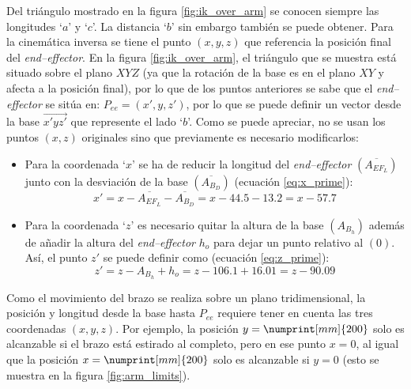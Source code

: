 Del triángulo mostrado en la figura \ref{fig:ik_over_arm} se conocen siempre las longitudes
`$a$' y `$c$'. La distancia `$b$' sin embargo también se puede obtener. Para la cinemática
inversa se tiene el punto $\left(x, y, z\right)$ que referencia la posición final del
\textit{end--effector}. En la figura \ref{fig:ik_over_arm}, el triángulo que se muestra
está situado sobre el plano $XYZ$ (ya que la rotación de la base es en el plano $XY$
y afecta a la posición final), por lo que de los puntos anteriores
se sabe que el \textit{end--effector} se sitúa en: $P_{ee} = \left(x', y, z'\right)$, 
por lo que se puede definir un vector desde la base $\overrightarrow{x'yz'}$ que 
represente el lado `$b$'. Como se puede apreciar, no se usan los puntos $\left(x, z\right)$ 
originales sino que previamente es necesario modificarlos:
\begin{itemize}
    \item Para la coordenada `$x$' se ha de reducir la longitud del \textit{end--effector}
    $\left(\overline{A_{EF_L}}\right)$ junto con la desviación de la base $\left(\overline{A_{B_D}}\right)$
    (ecuación \ref{eq:x_prime}):
    \begin{equation}\label{eq:x_prime}
        x' = x - \overline{A_{EF_L}} - \overline{A_{B_D}} = x - 44.5 - 13.2 = x - 57.7
    \end{equation}
    
    \item Para la coordenada `$z$' es necesario quitar la altura de la base $\left(A_{B_h}\right)$
    además de añadir la altura del \textit{end--effector} $h_o$ para dejar un punto 
    relativo al $\left(0\right)$. Así, el punto $z'$ se puede definir
    como (ecuación \ref{eq:z_prime}):
    \begin{equation}\label{eq:z_prime}
        z' = z - A_{B_h} + h_o = z - 106.1 + 16.01 = z - 90.09
    \end{equation}
\end{itemize}

Como el movimiento del brazo se realiza sobre un plano tridimensional, la posición y
longitud desde la base hasta $P_{ee}$ requiere tener en cuenta las tres coordenadas
$\left(x, y, z\right)$. Por ejemplo, la posición $y = \numprint[mm]{200}$ solo es 
alcanzable si el brazo está estirado al completo, pero en ese punto $x = 0$, al igual
que la posición $x = \numprint[mm]{200}$ solo es alcanzable si $y = 0$ (esto se muestra
en la figura \ref{fig:arm_limits}).

